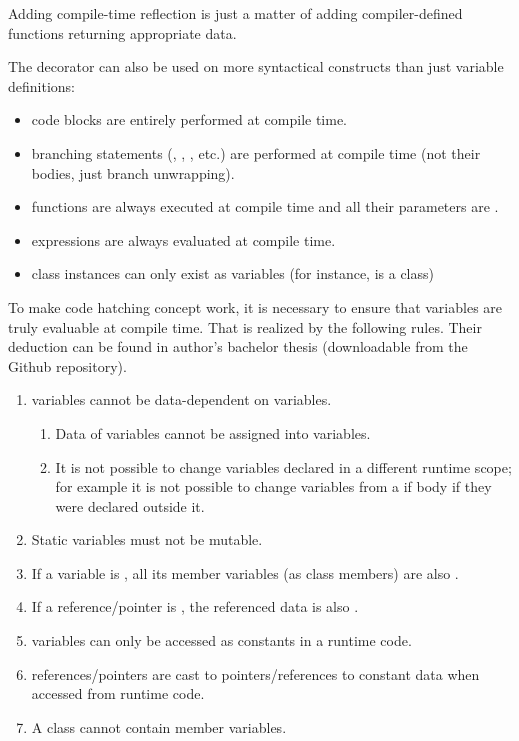 \documentclass{ExcelAtFIT}
\begin{document}
Adding compile-time reflection is just a matter of adding compiler-defined functions returning appropriate \ctime data.

The  decorator can also be used on more syntactical constructs than just variable definitions:
\begin{itemize}
	\item \ctime code blocks are entirely performed at compile time.
	\item \ctime branching statements (, , , etc.) are performed at compile time (not their bodies, just branch unwrapping).
	\item \ctime functions are always executed at compile time and all their parameters are \ctime.
	\item \ctime expressions are always evaluated at compile time.
	\item \ctime class instances can only exist as \ctime variables (for instance,  is a \ctime class)
\end{itemize}

To make code hatching concept work, it is necessary to ensure that \ctime variables are truly evaluable at compile time. That is realized by the following rules. Their deduction can be found in author's bachelor thesis \cite{MyThesis} (downloadable from the Github repository).
\begin{enumerate}
	\item \ctime variables cannot be data-dependent on \nonctime variables.
	\begin{enumerate}
		\item Data of \nonctime variables cannot be assigned into \ctime variables.
		\item It is not possible to change \ctime variables declared in a different runtime scope; for example it is not possible to change \ctime variables from a \nonctime if body if they were declared outside it.
	\end{enumerate}
	\item Static \ctime variables must not be mutable.
	\item If a variable is \ctime, all its member variables (as class members) are also \ctime.
	\item If a reference/pointer is \ctime, the referenced data is also \ctime.
	\item \ctime variables can only be accessed as constants in a runtime code.
	\item \ctime references/pointers are cast to pointers/references to constant data when accessed from runtime code.
	\item A \nonctime class cannot contain member \ctime variables.
\end{enumerate}
\end{document}
